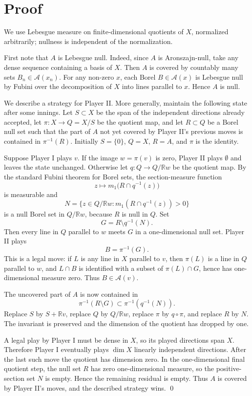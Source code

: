 \documentclass[11pt]{article}
\newcommand{\R}{\mathbb{R}}
\begin{document}
\section*{Proof}

We use Lebesgue measure on finite-dimensional quotients of \(X\), normalized
arbitrarily; nullness is independent of the normalization.

First note that \(A\) is Lebesgue null. Indeed, since \(A\) is Aronszajn-null,
take any dense sequence containing a basis of \(X\). Then \(A\) is covered by
countably many sets \(B_n\in\mathcal A(x_n)\). For any non-zero \(x\), each
Borel \(B\in\mathcal A(x)\) is Lebesgue null by Fubini over the decomposition
of \(X\) into lines parallel to \(x\). Hence \(A\) is null.

We describe a strategy for Player II. More generally, maintain the following
state after some innings. Let \(S\subset X\) be the span of the independent
directions already accepted, let \(\pi:X\to Q=X/S\) be the quotient map, and
let \(R\subset Q\) be a Borel null set such that the part of \(A\) not yet
covered by Player II's previous moves is contained in \(\pi^{-1}(R)\). Initially
\(S=\{0\}\), \(Q=X\), \(R=A\), and \(\pi\) is the identity.

Suppose Player I plays \(v\). If the image \(w=\pi(v)\) is zero, Player II plays
\(\emptyset\) and leaves the state unchanged. Otherwise let
\(q:Q\to Q/\R w\) be the quotient map. By the standard Fubini theorem for Borel
sets, the section-measure function
\[
z\mapsto m_1\bigl(R\cap q^{-1}(z)\bigr)
\]
is measurable and
\[
N=\{z\in Q/\R w: m_1(R\cap q^{-1}(z))>0\}
\]
is a null Borel set in \(Q/\R w\), because \(R\) is null in \(Q\). Set
\[
G=R\setminus q^{-1}(N).
\]
Then every line in \(Q\) parallel to \(w\) meets \(G\) in a one-dimensional null
set. Player II plays
\[
B=\pi^{-1}(G).
\]
This is a legal move: if \(L\) is any line in \(X\) parallel to \(v\), then
\(\pi(L)\) is a line in \(Q\) parallel to \(w\), and \(L\cap B\) is identified
with a subset of \(\pi(L)\cap G\), hence has one-dimensional measure zero.
Thus \(B\in\mathcal A(v)\).

The uncovered part of \(A\) is now contained in
\[
\pi^{-1}(R\setminus G)\subset \pi^{-1}(q^{-1}(N)).
\]
Replace \(S\) by \(S+\R v\), replace \(Q\) by \(Q/\R w\), replace \(\pi\) by
\(q\circ\pi\), and replace \(R\) by \(N\). The invariant is preserved and the
dimension of the quotient has dropped by one.

A legal play by Player I must be dense in \(X\), so its played directions span
\(X\). Therefore Player I eventually plays \(\dim X\) linearly independent
directions. After the last such move the quotient has dimension zero. In the
one-dimensional final quotient step, the null set \(R\) has zero
one-dimensional measure, so the positive-section set \(N\) is empty. Hence the
remaining residual is empty. Thus \(A\) is covered by Player II's moves, and
the described strategy wins.
\qed
\end{document}
